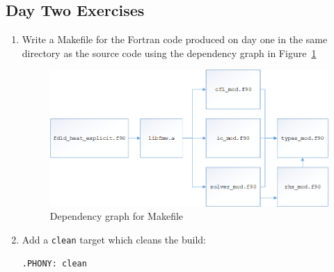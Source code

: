 \documentclass[12pt]{article}
\begin{document}
\subsection*{Day Two Exercises}
\begin{enumerate}
\item Write a Makefile for the Fortran code produced on day one in the same directory as the source
  code using the dependency graph in Figure~\ref{make_depend:eps}

\begin{figure}[H]
\includegraphics[width=\linewidth]{make_depend.png}
\caption{Dependency graph for Makefile}
\label{make_depend:eps}
\end{figure}
\item Add a \texttt{clean} target which cleans the build:
\begin{verbatim}
.PHONY: clean


\end{verbatim}
\end{enumerate}
\end{document}
